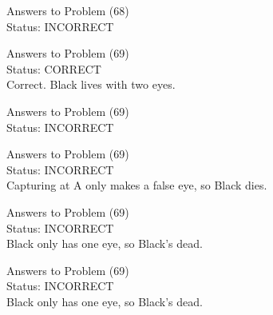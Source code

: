 \documentclass[11pt]{article}
\begin{document}
\begin{minipage}[t]{0.5\textwidth}
  {\centering
  
  Answers to Problem (68)\\
  Status: INCORRECT\\
  
  }
\end{minipage}
\begin{minipage}[t]{0.5\textwidth}
  {\centering
  
  Answers to Problem (69)\\
  Status: CORRECT\\
  Correct. Black lives with two eyes.\\
  }
\end{minipage}
\begin{minipage}[t]{0.5\textwidth}
  {\centering
  
  Answers to Problem (69)\\
  Status: INCORRECT\\
  
  }
\end{minipage}
\begin{minipage}[t]{0.5\textwidth}
  {\centering
  
  Answers to Problem (69)\\
  Status: INCORRECT\\
  Capturing at A only makes a false eye, so Black dies.\\
  }
\end{minipage}
\begin{minipage}[t]{0.5\textwidth}
  {\centering
  
  Answers to Problem (69)\\
  Status: INCORRECT\\
  Black only has one eye, so Black's dead.\\
  }
\end{minipage}
\begin{minipage}[t]{0.5\textwidth}
  {\centering
  
  Answers to Problem (69)\\
  Status: INCORRECT\\
  Black only has one eye, so Black's dead.\\
  }
\end{minipage}
\end{document}
